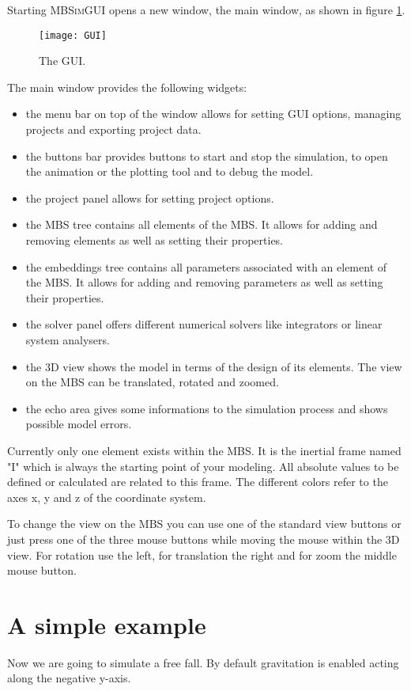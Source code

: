\documentclass[
a4paper,
fleqn,
DIV=15,
pagesize
]{scrartcl}
\begin{document}
Starting \textsc{MBSimGUI} opens a new window, the main window, as shown in figure \ref{GUI}.
\begin{figure}
\centering
\texttt{[image: GUI]}
\caption{The GUI.} \label{GUI}
\end{figure}
The main window provides the following widgets:
\begin{itemize}
  \item the menu bar on top of the window allows for setting GUI options, managing
  projects and exporting project data.
  \item the buttons bar provides buttons to start and stop the simulation, to open
  the animation or the plotting tool and to debug the model.
  \item the project panel allows for setting project options.
  \item the MBS tree contains all elements of the MBS.
  It allows for adding and removing elements as well as setting their properties.
  \item the embeddings tree contains all parameters associated with an element of
  the MBS. It allows for adding and removing parameters as well as setting their
  properties.
  \item the solver panel offers different numerical solvers like integrators or
  linear system analysers.
  \item the 3D view shows the model in terms of the design of its elements. The
  view on the MBS can be translated, rotated and zoomed.
  \item the echo area gives some informations to the simulation process and shows
  possible model errors.
\end{itemize}

Currently only one element exists within the MBS. It is the inertial frame named
"I" which is always the starting point of your modeling. All absolute values to
be defined or calculated are related to this frame. The different colors refer
to the axes {\color{red} x}, {\color{green} y} and {\color{blue} z} of the
coordinate system.

To change the view on the MBS you can use one of the standard view buttons or
just press one of the three mouse buttons while moving the mouse within the 3D
view. For rotation use the left, for translation the right and for zoom the
middle mouse button.

\section{A simple example}
Now we are going to simulate a free fall. By default gravitation is enabled
acting along the negative {\color{green}y-axis}.
\end{document}

